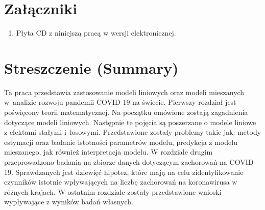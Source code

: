 \documentclass[12pt]{mwbk}
\theoremstyle{plain}
\theoremstyle{definition}
\theoremstyle{definition}
\begin{document}
\listoffigures

\listoftables


\chapter*{Załączniki}
\begin{enumerate}
\item Płyta CD z niniejszą pracą w wersji elektronicznej.
\end{enumerate}




\chapter*{Streszczenie (Summary)}

\bigskip
\bigskip

\begin{center}
  \textbf{\tytul}
\end{center}

Ta praca przedstawia zastosowanie modeli liniowych oraz modeli mieszanych w~analizie rozwoju pandemii COVID-19 na świecie. Pierwszy rozdział jest poświęcony teorii matematycznej. Na początku omówione zostają zagadnienia dotyczące modeli liniowych. Następnie te pojęcia są poszerzane o modele liniowe z efektami stałymi i~losowymi. Przedstawione zostały problemy takie jak: metody estymacji oraz badanie istotności parametrów modelu, predykcja z modelu mieszanego, jak również interpretacja modelu. W rozdziale drugim przeprowadzono badania na zbiorze danych dotyczącym zachorowań na COVID-19. Sprawdzanych jest dziewięć hipotez, które mają na celu zidentyfikowanie czynników istotnie wpływających na liczbę zachorowań na koronawirusa w różnych krajach. W ostatnim rozdziale zostały przedstawione wnioski wypływające z wyników badań własnych.


\bigskip

\begin{center}
  \textbf{\textit{\tytulangielski}}
\end{center}
\end{document}
